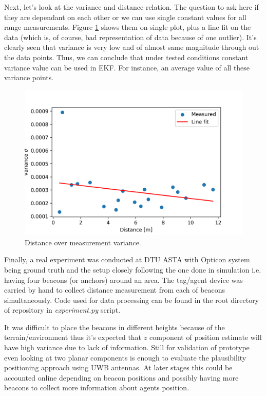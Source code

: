 Next, let's look at the variance and distance relation. The question to ask here if they are dependant on each other or we can use single constant values for all range measurements. Figure \ref{fig:distance_var} shows them on single plot, plus a line fit on the data (which is, of course, bad representation of data because of one outlier). It's clearly seen that variance is very low and of almost same magnitude through out the data points. Thus, we can conclude that under tested conditions constant variance value can be used in EKF. For instance, an average value of all these variance points.
\begin{figure}[H]
    \centering
    \includegraphics[width=\linewidth]{figures/dist_variance.png}
    \caption{Distance over measurement variance.}
    \label{fig:distance_var}
\end{figure}

Finally, a real experiment was conducted at DTU ASTA with Opticon system being ground truth and the setup closely following the one done in simulation i.e. having four beacons (or anchors) around an area. The tag/agent device was carried by hand to collect distance measurement from each of beacons simultaneously. Code used for data processing can be found in the root directory of repository in \emph{experiment.py} script.

It was difficult to place the beacons in different heights because of the terrain/environment thus it's expected that $z$ component of position estimate will have high variance due to lack of information. Still for validation of prototype even looking at two planar components is enough to evaluate the plausibility positioning approach using UWB antennas. At later stages this could be accounted online depending on beacon positions and possibly having more beacons to collect more information about agents position.

